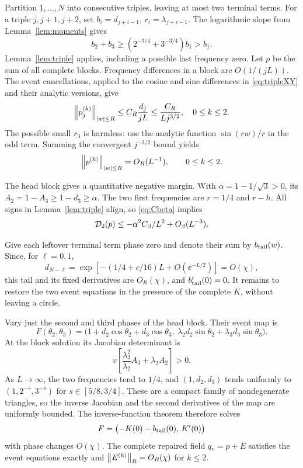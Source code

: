 Partition \(1,\ldots,N\) into consecutive triples, leaving at most two
terminal terms. For a triple \(j,j+1,j+2\), set
\(b_i=d_{j+i-1}\), \(r_i=\lambda_{j+i-1}\).
The logarithmic slope from Lemma~\ref{lem:moments} gives
\[
 b_2+b_3\ge(2^{-3/4}+3^{-3/4})b_1>b_1.
\]
Lemma~\ref{lem:triple} applies, including a possible last frequency
zero. Let \(p\) be the sum of all complete blocks.
Frequency differences in a block are \(O(1/(jL))\).
The event cancellations, applied to the cosine and sine differences
in \eqref{eq:tripleXY} and their analytic versions, give
\[
 \left\lVert p_j^{(k)}\right\rVert_{|w|\le R}\le C_R\frac{d_j}{jL}
                 \le \frac{C_R}{Lj^{3/2}},\quad 0\le k\le2.
\]
The possible small \(r_3\) is harmless: use the analytic function
\(\sin(rw)/r\) in the odd term. Summing the convergent \(j^{-3/2}\)
bound yields
\begin{equation}\label{eq:circlefieldbound}
 \left\lVert p^{(k)}\right\rVert_{|w|\le R}=O_R(L^{-1}),\qquad 0\le k\le2.
\end{equation}

The head block gives a quantitative negative margin. With
\(\alpha=1-1/\sqrt3>0\), its \(A_2=1-A_3\ge1-d_3\ge\alpha\).
The two first frequencies are \(r=1/4\) and \(r-h\).
All signs in Lemma~\ref{lem:triple} align, so \eqref{eq:Cbeta} implies
\begin{equation}\label{eq:circleleading}
 \mathcal D_2(p)\le-\alpha^2 C_\beta/L^2+O_\beta(L^{-3}).
\end{equation}

Give each leftover terminal term phase zero and denote their sum by
\(b_{\rm tail}(w)\). Since, for \(\ell=0,1\),
\[
 d_{N-\ell}
 =\exp[-(1/4+c/16)L+O(\ee^{-L/2})]=O(\chi),
\]
this tail and its fixed derivatives are \(O_R(\chi)\), and
\(b_{\rm tail}'(0)=0\).
It remains to restore the two event equations in the presence of the
complete \(K\), without leaving a circle.

Vary just the second and third phases of the head block. Their event
map is
\[
 F(\theta_2,\theta_3)=
 \bigl(1+d_2\cos\theta_2+d_3\cos\theta_3,\
       \lambda_2d_2\sin\theta_2+\lambda_3d_3\sin\theta_3\bigr).
\]
At the block solution its Jacobian determinant is
\[
 v\left[\frac{\lambda_3^2}{\lambda_2}A_3+\lambda_2A_2\right]>0.
\]
As \(L\to\infty\), the two frequencies tend to \(1/4\), and
\((1,d_2,d_3)\) tends uniformly to \((1,2^{-s},3^{-s})\) for
\(s\in[5/8,3/4]\). These are a compact family of nondegenerate
triangles, so the inverse Jacobian and the second derivatives of the
map are uniformly bounded. The inverse-function theorem therefore
solves
\[
 F=\bigl(-K(0)-b_{\rm tail}(0),\,K'(0)\bigr)
\]
with phase changes \(O(\chi)\). The complete repaired field
\(q_*=p+E\) satisfies the event equations exactly and
\(\left\lVert E^{(k)}\right\rVert_R=O_R(\chi)\) for \(k\le2\).

